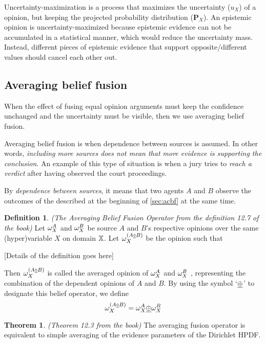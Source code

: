 \documentclass[a4paper,12pt]{article}
\theoremstyle{definition}
\newtheorem{definition}{Definition}[section]
\theoremstyle{theorem}
\newtheorem{theorem}{Theorem}[section]
\numberwithin{equation}{section}
\begin{document}
Uncertainty-maximization is a process that maximizes the uncertainty ($u_{X}$) of a opinion, but keeping the projected probability distribution ($\mathbf{P}_X$). An epistemic opinion is uncertainty-maximized because epistemic evidence can not be accumulated in a statistical manner, which would reduce the uncertainty mass. Instead, different pieces of epistemic evidence that support opposite/different values should cancel each other out.


\subsection{Averaging belief fusion}

When the effect of fusing equal opinion arguments must keep the confidence unchanged and the uncertainty must be visible, then we use averaging belief fusion.

Averaging belief fusion is when dependence between sources is assumed. In other words, \emph{including more sources does not mean that more evidence is supporting the conclusion}. An example of this type of situation is when a jury tries to \emph{reach a verdict} after having observed the court proceedings.

By \emph{dependence between sources}, it means that two agents $A$ and $B$ observe the outcomes of the described at the beginning of \ref{sec:acbf} at the same time.

\begin{definition}
\emph{(The Averaging Belief Fusion Operator from the definition 12.7 of the book)} Let $\omega^{A}_{X}$ and $\omega^{B}_{X}$ be source $A$ and $B$’s respective opinions over the same (hyper)variable $X$ on domain $\mathbb{X}$. Let $\omega^{(A \underline{\diamond} B)}_{X}$ be the opinion such that

[Details of the definition goes here]

Then $\omega^{(A \underline{\diamond} B)}_{X}$ is called the averaged opinion of $\omega^{A}_{X}$ and $\omega^{B}_{X}$ , representing the combination of the dependent opinions of $A$ and $B$. By using the symbol `$\underline{\oplus}$' to designate this belief operator, we define
\begin{equation}
\omega^{(A \underline{\diamond} B)}_{X} = \omega^{A}_{X} \underline{\oplus} \omega^{B}_{X}
\end{equation}
\end{definition}

\begin{theorem}
\emph{(Theorem 12.3 from the book)} The averaging fusion operator is equivalent to
simple averaging of the evidence parameters of the Dirichlet HPDF.
\end{theorem}
\end{document}
